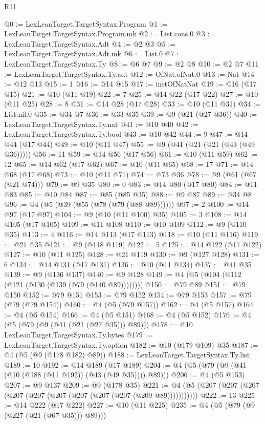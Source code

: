 \begin{lexlean}{R11}
\begin{coremodule}
@0 := LexLeanTarget.TargetSyntax.Program
@1 := LexLeanTarget.TargetSyntax.Program.mk
@2 := List.cons.{0}
@3 := LexLeanTarget.TargetSyntax.Adt
@4 := @2 @3
@5 := LexLeanTarget.TargetSyntax.Adt.mk
@6 := List.{0}
@7 := LexLeanTarget.TargetSyntax.Ty
@8 := @6 @7
@9 := @2 @8
@10 := @2 @7
@11 := LexLeanTarget.TargetSyntax.Ty.adt
@12 := OfNat.ofNat.{0}
@13 := Nat
@14 := @12 @13
@15 := 1
@16 := @14 @15
@17 := instOfNatNat
@19 := @16 (@17 @15)
@21 := @10 (@11 @19)
@22 := 7
@25 := @14 @22 (@17 @22)
@27 := @10 (@11 @25)
@28 := 8
@31 := @14 @28 (@17 @28)
@33 := @10 (@11 @31)
@34 := List.nil.{0}
@35 := @34 @7
@36 := @33 @35
@39 := @9 (@21 (@27 @36))
@40 := LexLeanTarget.TargetSyntax.Ty.nat
@41 := @10 @40
@42 := LexLeanTarget.TargetSyntax.Ty.bool
@43 := @10 @42
@44 := 9
@47 := @14 @44 (@17 @44)
@49 := @10 (@11 @47)
@55 := @9 (@41 (@21 (@21 (@43 (@49 @36)))))
@56 := 11
@59 := @14 @56 (@17 @56)
@61 := @10 (@11 @59)
@62 := 12
@65 := @14 @62 (@17 @62)
@67 := @10 (@11 @65)
@68 := 17
@71 := @14 @68 (@17 @68)
@73 := @10 (@11 @71)
@74 := @73 @36
@78 := @9 (@61 (@67 (@21 @74)))
@79 := @9 @35
@80 := 0
@83 := @14 @80 (@17 @80)
@84 := @11 @83
@85 := @10 @84
@87 := @85 (@85 @35)
@88 := @9 @87
@89 := @34 @8
@96 := @4 (@5 (@39 (@55 (@78 (@79 (@88 @89))))))
@97 := 2
@100 := @14 @97 (@17 @97)
@104 := @9 (@10 (@11 @100) @35)
@105 := 3
@108 := @14 @105 (@17 @105)
@109 := @11 @108
@110 := @10 @109
@112 := @9 (@110 @35)
@113 := 4
@116 := @14 @113 (@17 @113)
@118 := @10 (@11 @116)
@119 := @21 @35
@121 := @9 (@118 @119)
@122 := 5
@125 := @14 @122 (@17 @122)
@127 := @10 (@11 @125)
@128 := @21 @119
@130 := @9 (@127 @128)
@131 := 6
@134 := @14 @131 (@17 @131)
@136 := @10 (@11 @134)
@137 := @41 @35
@139 := @9 (@136 @137)
@140 := @9 @128
@149 := @4 (@5 (@104 (@112 (@121 (@130 (@139 (@79 (@140 @89))))))))
@150 := @79 @89
@151 := @79 @150
@152 := @79 @151
@153 := @79 @152
@154 := @79 @153
@157 := @79 (@79 (@79 @154))
@160 := @4 (@5 (@79 @157))
@162 := @4 (@5 @157)
@164 := @4 (@5 @154)
@166 := @4 (@5 @151)
@168 := @4 (@5 @152)
@176 := @4 (@5 (@79 (@9 (@41 (@21 (@27 @35))) @89)))
@178 := @10 LexLeanTarget.TargetSyntax.Ty.bytes
@179 := LexLeanTarget.TargetSyntax.Ty.option
@182 := @10 (@179 @109) @35
@187 := @4 (@5 (@9 (@178 @182) @89))
@188 := LexLeanTarget.TargetSyntax.Ty.list
@189 := 10
@192 := @14 @189 (@17 @189)
@204 := @4 (@5 (@79 (@9 (@41 (@10 (@188 (@11 @192)) (@43 (@49 @35)))) @89)))
@206 := @4 (@5 @153)
@207 := @9 @137
@209 := @9 (@178 @35)
@221 := @4 (@5 (@207 (@207 (@207 (@207 (@207 (@207 (@207 (@207 (@207 (@209 @89)))))))))))
@222 := 13
@225 := @14 @222 (@17 @222)
@227 := @10 (@11 @225)
@235 := @4 (@5 (@79 (@9 (@227 (@21 (@67 @35))) @89)))

\end{coremodule}
\end{lexlean}
